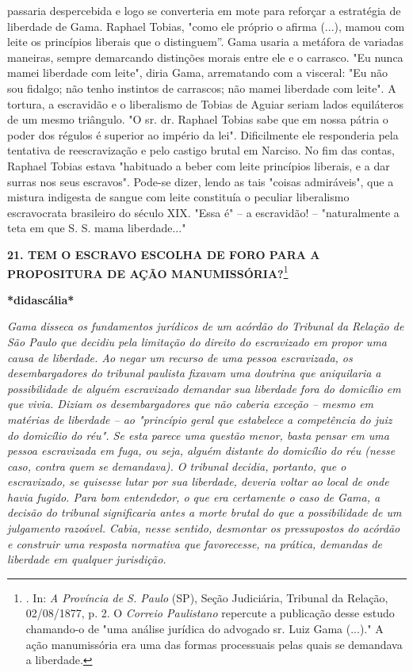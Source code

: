 {passaria despercebida e logo se converteria em mote para reforçar a
estratégia de liberdade de Gama. Raphael Tobias, "como ele próprio o
afirma (...), mamou com leite os princípios liberais que o distinguem''.
Gama usaria a metáfora de variadas maneiras, sempre demarcando
distinções morais entre ele e o carrasco. "Eu nunca mamei liberdade com
leite", diria Gama, arrematando com a visceral: "Eu não sou fidalgo; não
tenho instintos de carrascos; não mamei liberdade com leite". A tortura,
a escravidão e o liberalismo de Tobias de Aguiar seriam lados
equiláteros de um mesmo triângulo. "O sr. dr. Raphael Tobias sabe que em
nossa pátria o poder dos régulos é superior ao império da lei".
Dificilmente ele responderia pela tentativa de reescravização e pelo
castigo brutal em Narciso. No fim das contas, Raphael Tobias estava
"habituado a beber com leite princípios liberais, e a dar surras nos
seus escravos". Pode-se dizer, lendo as tais "coisas admiráveis", que a
mistura indigesta de sangue com leite constituía o peculiar liberalismo
escravocrata brasileiro do século XIX. "Essa é" -- a escravidão! --
"naturalmente a teta em que S. S. mama liberdade..."}

\textbf{21. TEM O ESCRAVO ESCOLHA DE FORO PARA A PROPOSITURA DE AÇÃO
MANUMISSÓRIA?}\footnote{. In: \emph{A Província de S. Paulo} (SP), Seção
  Judiciária, Tribunal da Relação, 02/08/1877, p. 2. O \emph{Correio
  Paulistano} repercute a publicação desse estudo chamando-o de "uma
  análise jurídica do advogado sr. Luiz Gama (...)." A ação manumissória
  era uma das formas processuais pelas quais se demandava a liberdade.}

\textbf{*didascália*}

\emph{Gama disseca os fundamentos jurídicos de um acórdão do Tribunal da
Relação de São Paulo que decidiu pela limitação do direito do
escravizado em propor uma causa de liberdade. Ao negar um recurso de uma
pessoa escravizada, os desembargadores do tribunal paulista fixavam uma
doutrina que aniquilaria a possibilidade de alguém escravizado demandar
sua liberdade fora do domicílio em que vivia. Diziam os desembargadores
que não caberia exceção -- mesmo em matérias de liberdade -- ao
"princípio geral que estabelece a competência do juiz do domicílio do
réu". Se esta parece uma questão menor, basta pensar em uma pessoa
escravizada em fuga, ou seja, alguém distante do domicílio do réu (nesse
caso, contra quem se demandava). O tribunal decidia, portanto, que o
escravizado, se quisesse lutar por sua liberdade, deveria voltar ao
local de onde havia fugido. Para bom entendedor, o que era certamente o
caso de Gama, a decisão do tribunal significaria antes a morte brutal do
que a possibilidade de um julgamento razoável. Cabia, nesse sentido,
desmontar os pressupostos do acórdão e construir uma resposta normativa
que favorecesse, na prática, demandas de liberdade em qualquer
jurisdição. }

